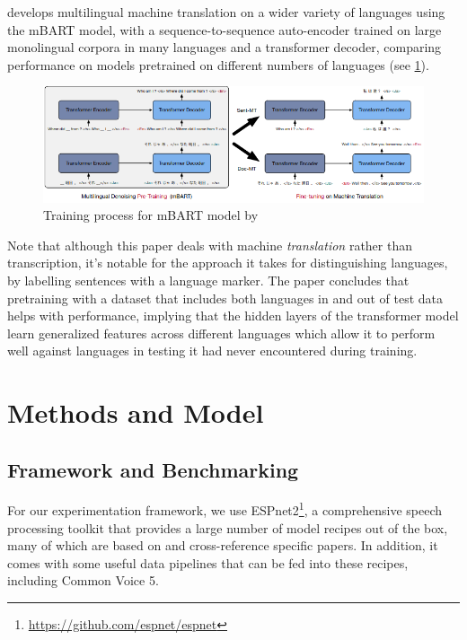 \documentclass{article}
\begin{document}
  \cite{Liu} develops multilingual machine translation on a wider variety of languages using the mBART model, with a sequence-to-sequence auto-encoder trained on large monolingual corpora in many languages and a transformer decoder, comparing performance on models pretrained on different numbers of languages (see \ref{diagram liu}).
  \begin{figure}[H]
    \includegraphics[width=\textwidth]{images/diagram-liu}
    \caption{Training process for mBART model by \cite{Liu}}
    \label{diagram liu}
  \end{figure}
  Note that although this paper deals with machine \emph{translation} rather than transcription, it's notable for the approach it takes for distinguishing languages, by labelling sentences with a language marker. The paper concludes that pretraining with a dataset that includes both languages in and out of test data helps with performance, implying that the hidden layers of the transformer model learn generalized features across different languages which allow it to perform well against languages in testing it had never encountered during training.
  \section{Methods and Model}
  \subsection{Framework and Benchmarking}
  For our experimentation framework, we use ESPnet2\footnote{\url{https://github.com/espnet/espnet}}, a comprehensive speech processing toolkit that provides a large number of model recipes out of the box, many of which are based on and cross-reference specific papers. In addition, it comes with some useful data pipelines that can be fed into these recipes, including Common Voice 5.
\end{document}

